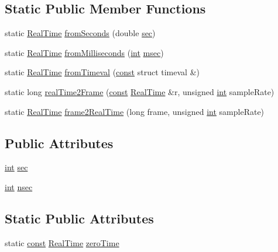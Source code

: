 \subsection*{Static Public Member Functions}
\begin{DoxyCompactItemize}
\item 
static \hyperlink{struct_vamp_1_1_real_time}{Real\+Time} \hyperlink{struct_vamp_1_1_real_time_a754901a59483036097d8111b8c02f4f3}{from\+Seconds} (double \hyperlink{struct_vamp_1_1_real_time_ab4d81983384a9f57ce064e6c343f2267}{sec})
\item 
static \hyperlink{struct_vamp_1_1_real_time}{Real\+Time} \hyperlink{struct_vamp_1_1_real_time_a512ca91f967c1d7923456f426926a9f6}{from\+Milliseconds} (\hyperlink{xmltok_8h_a5a0d4a5641ce434f1d23533f2b2e6653}{int} \hyperlink{struct_vamp_1_1_real_time_a76e22815db51ae180c38021110da9947}{msec})
\item 
static \hyperlink{struct_vamp_1_1_real_time}{Real\+Time} \hyperlink{struct_vamp_1_1_real_time_affdd22eee09b38335d3133c0e9a8f7b3}{from\+Timeval} (\hyperlink{getopt1_8c_a2c212835823e3c54a8ab6d95c652660e}{const} struct timeval \&)
\item 
static long \hyperlink{struct_vamp_1_1_real_time_a1c32b50b1511cdca17cd6c1c3c05d9b5}{real\+Time2\+Frame} (\hyperlink{getopt1_8c_a2c212835823e3c54a8ab6d95c652660e}{const} \hyperlink{struct_vamp_1_1_real_time}{Real\+Time} \&r, unsigned \hyperlink{xmltok_8h_a5a0d4a5641ce434f1d23533f2b2e6653}{int} sample\+Rate)
\item 
static \hyperlink{struct_vamp_1_1_real_time}{Real\+Time} \hyperlink{struct_vamp_1_1_real_time_a3a5ecc8888b559aad3b7d96911786b3a}{frame2\+Real\+Time} (long frame, unsigned \hyperlink{xmltok_8h_a5a0d4a5641ce434f1d23533f2b2e6653}{int} sample\+Rate)
\end{DoxyCompactItemize}
\subsection*{Public Attributes}
\begin{DoxyCompactItemize}
\item 
\hyperlink{xmltok_8h_a5a0d4a5641ce434f1d23533f2b2e6653}{int} \hyperlink{struct_vamp_1_1_real_time_ab4d81983384a9f57ce064e6c343f2267}{sec}
\item 
\hyperlink{xmltok_8h_a5a0d4a5641ce434f1d23533f2b2e6653}{int} \hyperlink{struct_vamp_1_1_real_time_a2078835bef7bb92514a65b6051cfc6c8}{nsec}
\end{DoxyCompactItemize}
\subsection*{Static Public Attributes}
\begin{DoxyCompactItemize}
\item 
static \hyperlink{getopt1_8c_a2c212835823e3c54a8ab6d95c652660e}{const} \hyperlink{struct_vamp_1_1_real_time}{Real\+Time} \hyperlink{struct_vamp_1_1_real_time_abe453371597710148b0fd19bb452f8a9}{zero\+Time}
\end{DoxyCompactItemize}


